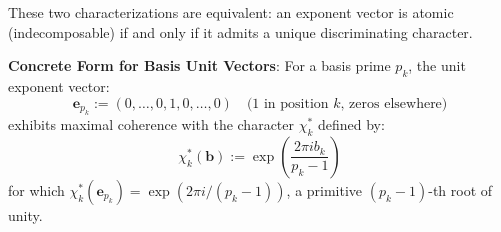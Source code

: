 \begin{definition}
These two characterizations are equivalent: an exponent vector is atomic (indecomposable) if and only if it admits a unique discriminating character.

\noindent \textbf{Concrete Form for Basis Unit Vectors}: For a basis prime $p_k$, the unit exponent vector:
\begin{equation}
\mathbf{e}_{p_k} := (0, \ldots, 0, 1, 0, \ldots, 0) \quad \text{(1 in position $k$, zeros elsewhere)}
\end{equation}
exhibits maximal coherence with the character $\chi^*_k$ defined by:
\begin{equation}
\chi^*_k(\mathbf{b}) := \exp\left(\frac{2\pi i b_k}{p_k - 1}\right)
\end{equation}
for which $\chi^*_k(\mathbf{e}_{p_k}) = \exp(2\pi i / (p_k-1))$, a primitive $(p_k-1)$-th root of unity.

\end{definition}

